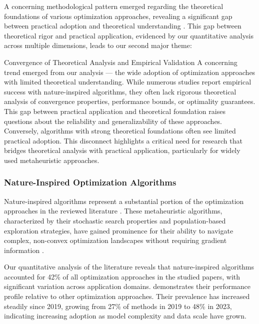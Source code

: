 \documentclass[acmsmall]{acmart}
\begin{document}
A concerning methodological pattern emerged regarding the theoretical foundations of various optimization approaches, revealing a significant gap between practical adoption and theoretical understanding \citep{Yang2019}. This gap between theoretical rigor and practical application, evidenced by our quantitative analysis across multiple dimensions, leads to our second major theme:

\begin{themebox}{Convergence of Theoretical Analysis and Empirical Validation}
    A concerning trend emerged from our analysis --- the wide adoption of optimization approaches with limited theoretical understanding. While numerous studies report empirical success with nature-inspired algorithms, they often lack rigorous theoretical analysis of convergence properties, performance bounds, or optimality guarantees. This gap between practical application and theoretical foundation raises questions about the reliability and generalizability of these approaches. Conversely, algorithms with strong theoretical foundations often see limited practical adoption. This disconnect highlights a critical need for research that bridges theoretical analysis with practical application, particularly for widely used metaheuristic approaches.
\end{themebox}

\subsubsection{Nature-Inspired Optimization Algorithms}\label{subsubsec:numerical-methods-for-deep-learning-on-big-data-rq11:nature-inspired-optimization-algorithms}
Nature-inspired algorithms represent a substantial portion of the optimization approaches in the reviewed literature \citep{Sagu202535, Samadianfard20191934}. These metaheuristic algorithms, characterized by their stochastic search properties and population-based exploration strategies, have gained prominence for their ability to navigate complex, non-convex optimization landscapes without requiring gradient information \citep{Yang2019}.

Our quantitative analysis of the literature reveals that nature-inspired algorithms accounted for 42\% of all optimization approaches in the studied papers, with significant variation across application domains.  demonstrates their performance profile relative to other optimization approaches. Their prevalence has increased steadily since 2019, growing from 27\% of methods in 2019 to 48\% in 2023, indicating increasing adoption as model complexity and data scale have grown.
\end{document}
